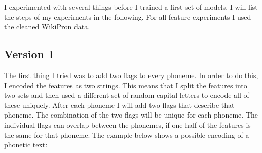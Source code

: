 I experimented with several things before I trained a first set of models. I will list the steps of my experiments in the following. For all feature experiments I used the cleaned WikiPron data.


\subsection*{Version 1}

The first thing I tried was to add two flags to every phoneme. In order to do this, I encoded the features as two strings. This means that I split the features into two sets and then used a different set of random capital letters to encode all of these uniquely. After each phoneme I will add two flags that describe that phoneme. The combination of the two flags will be unique for each phoneme. The individual flags can overlap between the phonemes, if one half of the features is the same for that phoneme. The example below shows a possible encoding of a phonetic text:

